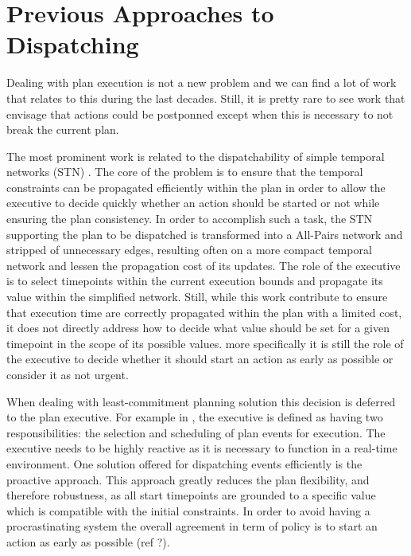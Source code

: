 \section{Previous Approaches to Dispatching}


Dealing with plan execution is not a new problem and we can find a lot
of work that relates to this during the last decades. Still, it is
pretty rare to see work that envisage that actions could be
postponned except when this is necessary to not break the current
plan. 


The most prominent work is related to the dispatchability of simple 
temporal networks (STN) \cite{mus98a}. The core of the problem is to
ensure that the temporal constraints can be propagated efficiently
within the plan in order to allow the executive to decide quickly
whether an action should  be started or not while ensuring the plan
consistency. In order to accomplish such a task, the STN supporting
the plan to be dispatched is transformed into a All-Pairs network and
stripped of unnecessary edges, resulting often on a more compact
temporal network and lessen the propagation cost of its updates. The
role of the executive is to select timepoints within the current
execution bounds and propagate its value within the simplified
network. Still, while this work contribute to ensure that execution
time are correctly propagated within the plan with a limited cost, it
does not directly address how to decide what value should be set for a
given timepoint in the scope of its possible values. more specifically
it is still the role of the executive to decide whether it should
start an action as early as possible or consider it as not urgent. 

When dealing with least-commitment planning solution this decision is
deferred to the plan executive. For example in \cite{mus98c} 
, the executive is defined as
having two responsibilities: the selection and scheduling of plan
events for execution. The executive needs to
be highly reactive as it is necessary to function in a real-time
environment. One solution offered for dispatching events efficiently
is the proactive approach. This approach greatly reduces the plan
flexibility, and therefore robustness, as all start timepoints are
grounded to a specific value which is compatible with the initial
constraints. In order to avoid having a procrastinating system the
overall agreement in term of policy is to start an action as early as
possible (ref ?). 

